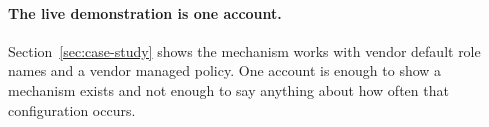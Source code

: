 \paragraph{The live demonstration is one account.}
Section~\ref{sec:case-study} shows the mechanism works with vendor default
role names and a vendor managed policy. One account is enough to show a
mechanism exists and not enough to say anything about how often that
configuration occurs.
